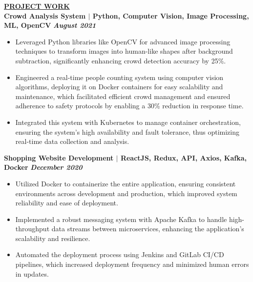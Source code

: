 \documentclass{article}
\begin{document}
\vspace{2mm}
\noindent \textbf{\underline{PROJECT WORK}} \\
\noindent \textbf{Crowd Analysis System $\mid$ Python, Computer Vision, Image Processing, ML, OpenCV} \textit{\hfill \textbf{August 2021}}
\begin{itemize}[noitemsep,nolistsep,leftmargin=*]
  \item {\small Leveraged Python libraries like OpenCV for advanced image processing techniques to transform images into human-like shapes after background subtraction, significantly enhancing crowd detection accuracy by 25\%.}
  \item {\small Engineered a real-time people counting system using computer vision algorithms, deploying it on Docker containers for easy scalability and maintenance, which facilitated efficient crowd management and ensured adherence to safety protocols by enabling a 30\% reduction in response time.}
  \item {\small Integrated this system with Kubernetes to manage container orchestration, ensuring the system's high availability and fault tolerance, thus optimizing real-time data collection and analysis.}
\end{itemize}
\vspace{1mm} 

\noindent \textbf{Shopping Website Development $\mid$ ReactJS, Redux, API, Axios, Kafka, Docker} \textit{\hfill \textbf{December 2020}} 
\begin{itemize}[noitemsep,nolistsep,leftmargin=*]
  \item {\small Utilized Docker to containerize the entire application, ensuring consistent environments across development and production, which improved system reliability and ease of deployment.}
  \item {\small Implemented a robust messaging system with Apache Kafka to handle high-throughput data streams between microservices, enhancing the application's scalability and resilience.}
  \item {\small Automated the deployment process using Jenkins and GitLab CI/CD pipelines, which increased deployment frequency and minimized human errors in updates.}
\end{itemize}
\end{document}
